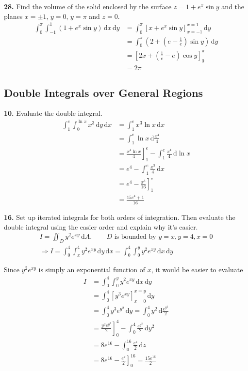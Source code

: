 \documentclass[a4paper,12pt]{article}
\newcommand{\ud}{\,\mathrm{d}}
\newcommand{\exercise}[1]{\noindent\textbf{#1.}}
\begin{document}
\exercise{28} Find the volume of the solid enclosed by the surface
$z = 1 + e^x\sin y$ and the planes $x = \pm 1$, $y = 0$, $y = \pi$ and $z = 0$.
\begin{align*}
   \int_0^\pi\int_{-1}^1(1 + e^x\sin y)\ud x \ud y
&= \int_0^\pi\left[x + e^x\sin y\right]_{x=-1}^{x=1}\ud y\\
&= \int_0^\pi\left(2 + \left(e - \frac{1}{e}\right)\sin y\right)\ud y\\
&= \left[2x + \left(\frac{1}{e} - e\right)\cos y\right]_0^\pi\\
&= 2\pi
\end{align*}

\subsection{Double Integrals over General Regions}
\exercise{10} Evaluate the double integral.
\begin{align*}
   \int_1^e\int_0^{\ln x}x^3\ud y\ud x
&= \int_1^e x^3\ln x\ud x\\
&= \int_1^e\ln x\ud\frac{x^4}{4}\\
&= \left.\frac{x^4\ln x}{4}\right]_1^e - \int_1^e\frac{x^4}{4}\ud\ln x\\
&= e^4 - \int_1^e\frac{x^3}{4}\ud x\\
&= e^4 - \left.\frac{x^4}{16}\right]_1^e\\
&= \frac{15e^4 + 1}{16}
\end{align*}

\exercise{16} Set up iterated integrals for both orders of integration.
Then evaluate the double integral using the easier order
and explain why it’s easier.
\begin{multline*}
  I = \iint_D y^2 e^{xy}\ud A,\qquad D\text{ is bounded by }y = x, y = 4, x = 0\\
  \Longrightarrow I = \int_0^4\int_x^4 y^2 e^{xy}\ud y\ud x
  = \int_0^4\int_0^y y^2 e^{xy}\ud x\ud y
\end{multline*}

Since $y^2 e^{xy}$ is simply an exponential function of $x$,
it would be easier to evaluate
\begin{align*}
I &= \int_0^4\int_0^y y^2 e^{xy}\ud x\ud y\\
  &= \int_0^4\left[y^3 e^{xy}\right]_{x=0}^{x=y}\ud y\\
  &= \int_0^4 y^3 e^{y^2}\ud y
   = \int_0^4 y^2\ud\frac{e^{y^2}}{2}\\
  &= \left.\frac{y^2 e^{y^2}}{2}\right]_0^4 - \int_0^4\frac{e^{y^2}}{2}\ud y^2\\
  &= 8e^{16} - \int_0^{16}\frac{e^z}{2}\ud z\\
  &= 8e^{16} - \left.\frac{e^z}{2}\right]_0^{16}
   = \frac{15e^{16}}{2}
\end{align*}
\end{document}
